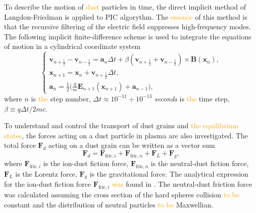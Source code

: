 \documentclass[twocolumn, prd, nobalancelastpage, superscriptaddress]{revtex4}
\newcommand{\alarm}[1]{\textcolor{red}{#1}}
\newcommand{\maybe}[1]{\textcolor{orange}{#1}}
\newcommand{\bs}{\boldsymbol}
\begin{document}

To describe the motion of \maybe{dust} particles in time, the direct implicit method of Langdon-Friedman is applied to PIC algorythm. The \maybe{essence} of this method is that the recursive filtering of the electric field suppresses high-frequency modes. The following implicit finite-difference scheme is used to integrate the equations of motion in a cylindrical coordinate system
\begin{equation*}
    \begin{cases}
        \bs{v}_{n+\frac{1}{2}}-\bs{v}_{n-\frac{1}{2}} = \bs{a}_n\Delta t + \beta (\bs{v}_{n+\frac{1}{2}}+\bs{v}_{n-\frac{1}{2}})\times \bs{B}(\bs{x}_n),\\
        \bs{x}_{n+1} = \bs{x}_n + \bs{v}_{n+\frac{1}{2}}\Delta t,\\
        \bs{a}_n = \frac{1}{2}\big(\frac{q}{m}\bs{E}_{n+1}(\bs{x}_{n+1}) + \bs{a}_{n-1}\big),
    \end{cases}
\end{equation*}
where $n$ is \maybe{the} step number, $\Delta t \approx 10^{-11}\div 10^{-13}$ \textit{seconds} is \maybe{the} time step, $\beta \equiv q\Delta t/2mc$.

To understand and control the transport of dust grains and \maybe{the equilibrium states}, the forces acting on a dust particle in plasma are also investigated. The total force $\bs{F}_d$ acting on a dust grain can be written as a vector sum
\begin{equation*}
    \bs{F}_d = \bs{F}_{\text{fric}, i} + \bs{F}_{\text{fric}, n} + \bs{F}_{L} + \bs{F}_{g},
\end{equation*}
where $\bs{F}_{\text{fric}, i}$ is the ion-dust fiction force, $\bs{F}_{\text{fric}, n}$ is the neutral-dust fiction force, $\bs{F}_{L}$ is the Lorentz force, $\bs{F}_{g}$ is the gravitational force. 
The analytical expression for the ion-dust fiction force $\bs{F}_{\text{fric}, i}$ \maybe{was} found in \cite{Khrapak04, Hutchinson05}. The neutral-dust friction force was calculated assuming the cross section of the hard spheres collision \maybe{to be} constant and the distribution of neutral particles \maybe{to be} Maxwellian.
\end{document}
